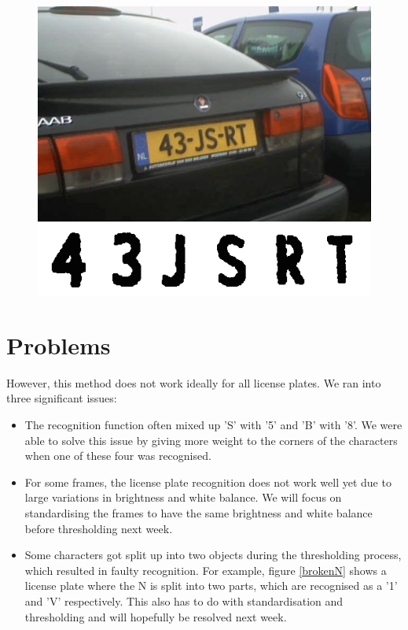 \documentclass{tudelftposter}
\begin{document}
\begin{figure}[h]
	\centering
	\includegraphics[width=800pt]{goodcar.png}
\end{figure}

\section{Problems}
However, this method does not work ideally for all license plates. We ran into three significant issues:
\begin{itemize}
\item The recognition function often mixed up 'S' with '5' and 'B' with '8'. We were able to solve this issue by giving more weight to the corners of the characters when one of these four was recognised.
\item For some frames, the license plate recognition does not work well yet due to large variations in brightness and white balance. We will focus on standardising the frames to have the same brightness and white balance before thresholding next week.
\item Some characters got split up into two objects during the thresholding process, which resulted in faulty recognition. For example, figure \ref{brokenN} shows a license plate where the N is split into two parts, which are recognised as a '1' and 'V' respectively. This also has to do with standardisation and thresholding and will hopefully be resolved next week.
\end{itemize}
\end{document}
